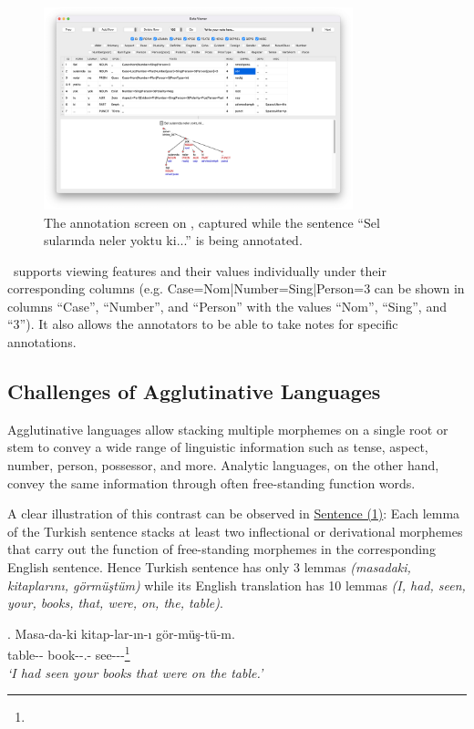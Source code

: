 \begin{figure}[th!]
    \centering
        \includegraphics[width=0.8\textwidth]{figures/boat-v1-march-sample-annotation-mac.png}
        \caption{The annotation screen on \boatvone, captured while the sentence ``Sel sularında neler yoktu ki...'' is being annotated.}
        \label{fig:anno-fig-v1}
\end{figure}

\boatvone\ supports viewing features and their values individually under their corresponding columns (e.g. Case=Nom|Number=Sing|Person=3 can be shown in columns ``Case'', ``Number'', and ``Person'' with the values ``Nom'', ``Sing'', and ``3'').
It also allows the annotators to be able to take notes for specific annotations.

\subsection{Challenges of Agglutinative Languages}
\label{sec:challenges}
Agglutinative languages allow stacking multiple morphemes on a single root or stem to convey a wide range of linguistic information such as tense, aspect, number, person, possessor, and more.
Analytic languages, on the other hand, convey the same information through often free-standing function words.

A clear illustration of this contrast can be observed in \hyperref[trex]{Sentence (1)}: Each lemma of the Turkish sentence stacks at least two inflectional or derivational morphemes that carry out the function of free-standing morphemes in the corresponding English sentence.
Hence Turkish sentence has only 3 lemmas \textit{(masadaki, kitaplarını, görmüştüm)} while its English translation has 10 lemmas \textit{(I, had, seen, your, books, that, were, on, the, table)}.

\ex.
\label{trex}
Masa-da-ki \hspace*{.573cm}kitap-lar-ın-ı \hspace*{1.8cm}gör-müş-tü-m.\\
table-{\sc \Loc-\Der} book-{\sc \Pl-\Poss.\Second\Sg-\Acc} see-{\sc \Ant-\Pst-\First\Sg}\footnote{\printglossaries}\\
\textit{`I had seen your books that were on the table.'}

